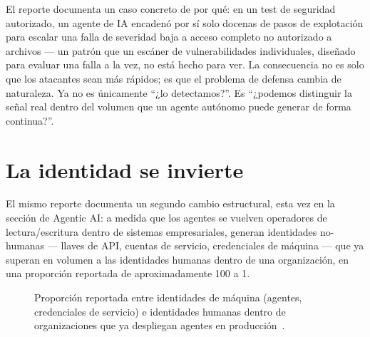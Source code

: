 \documentclass[10pt]{article}
\begin{document}
El reporte documenta un caso concreto de por qué: en un test de seguridad autorizado, un agente de IA encadenó por sí solo docenas de pasos de explotación para escalar una falla de severidad baja a acceso completo no autorizado a archivos --- un patrón que un escáner de vulnerabilidades individuales, diseñado para evaluar una falla a la vez, no está hecho para ver. La consecuencia no es solo que los atacantes sean más rápidos; es que el problema de defensa cambia de naturaleza. Ya no es únicamente ``¿lo detectamos?''. Es ``¿podemos distinguir la señal real dentro del volumen que un agente autónomo puede generar de forma continua?''.

\section{La identidad se invierte}

El mismo reporte documenta un segundo cambio estructural, esta vez en la sección de Agentic AI: a medida que los agentes se vuelven operadores de lectura/escritura dentro de sistemas empresariales, generan identidades no-humanas --- llaves de API, cuentas de servicio, credenciales de máquina --- que ya superan en volumen a las identidades humanas dentro de una organización, en una proporción reportada de aproximadamente 100 a 1.

\begin{figure}[h]
\centering
{}
\caption{Proporción reportada entre identidades de máquina (agentes, credenciales de servicio) e identidades humanas dentro de organizaciones que ya despliegan agentes en producción~\cite{mckinsey2026}.}
\label{fig:identity}
\end{figure}
\end{document}
